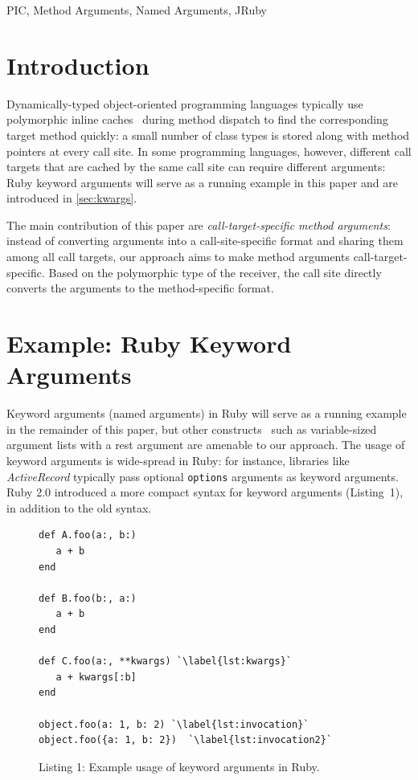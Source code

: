 \documentclass{sigplanconf} %
\begin{document}

\keywords
PIC, Method Arguments, Named Arguments, JRuby %

\section{Introduction}
Dynamically-typed object-oriented programming languages typically use polymorphic inline caches~\cite{Holzle:1991:ODO:646149.679193} during method dispatch to find the corresponding target method quickly: a small number of class types is stored along with method pointers at every call site. In some programming languages, however, different call targets that are cached by the same call site can require different arguments: Ruby keyword arguments will serve as a running example in this paper and are introduced in \autoref{sec:kwargs}. 

The main contribution of this paper are \emph{call-target-specific method arguments}: instead of converting arguments into a call-site-specific format and sharing them among all call targets, our approach aims to make method arguments call-target-specific. Based on the polymorphic type of the receiver, the call site directly converts the arguments to the method-specific format.

\section{Example: Ruby Keyword Arguments}
\label{sec:kwargs}
Keyword arguments (named arguments) in Ruby will serve as a running example in the remainder of this paper, but other constructs~\cite{Zdun05patternsof} such as variable-sized argument lists with a rest argument are amenable to our approach. The usage of keyword arguments is wide-spread in Ruby: for instance, libraries like \emph{ActiveRecord} typically pass optional \lstinline{options} arguments as keyword arguments. Ruby 2.0 introduced a more compact syntax for keyword arguments (Listing~1), in addition to the old syntax. 

\begin{figure}[!hbp] %
\begin{lstlisting}[basicstyle=\footnotesize\ttfamily] 
def A.foo(a:, b:)
   a + b
end

def B.foo(b:, a:)
   a + b
end

def C.foo(a:, **kwargs) `\label{lst:kwargs}`
   a + kwargs[:b]
end

object.foo(a: 1, b: 2) `\label{lst:invocation}`
object.foo({a: 1, b: 2})  `\label{lst:invocation2}`
\end{lstlisting}
\vspace{-0.25cm}
\caption*{Listing 1: Example usage of keyword arguments in Ruby.}
\end{figure}
\end{document}
